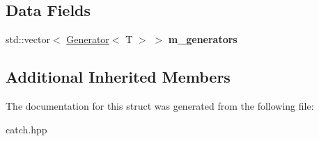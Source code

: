 \subsection*{Data Fields}
\begin{DoxyCompactItemize}
\item 
\mbox{\label{structCatch_1_1Generators_1_1Generators_a49f1d0e8851a4726bb9981edffe094fa}} 
std\+::vector$<$ \hyperlink{classCatch_1_1Generators_1_1Generator}{Generator}$<$ T $>$ $>$ {\bfseries m\+\_\+generators}
\end{DoxyCompactItemize}
\subsection*{Additional Inherited Members}


The documentation for this struct was generated from the following file\+:\begin{DoxyCompactItemize}
\item 
catch.\+hpp\end{DoxyCompactItemize}

